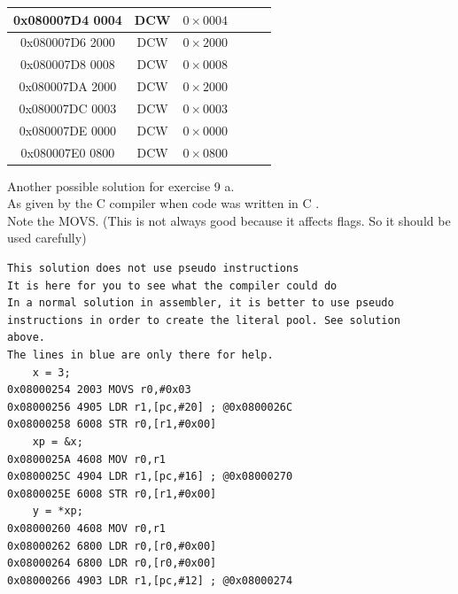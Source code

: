 \documentclass[10pt]{article}
\begin{document}
\begin{center}
\begin{tabular}{|c|c|c|c|c|c|}
\hline
0x080007D4 0004 & DCW & $0 \times 0004$ &  &  &  \\
\hline
0x080007D6 2000 & DCW & $0 \times 2000$ &  &  &  \\
\hline
0x080007D8 0008 & DCW & $0 \times 0008$ &  &  &  \\
\hline
0x080007DA 2000 & DCW & $0 \times 2000$ &  &  &  \\
\hline
0x080007DC 0003 & DCW & $0 \times 0003$ &  &  &  \\
\hline
0x080007DE 0000 & DCW & $0 \times 0000$ &  &  &  \\
\hline
0x080007E0 0800 & DCW & $0 \times 0800$ &  &  &  \\
\hline
\end{tabular}
\end{center}

Another possible solution for exercise 9 a.\\
As given by the C compiler when code was written in C .\\
Note the MOVS. (This is not always good because it affects flags. So it should be used carefully)

\begin{verbatim}
This solution does not use pseudo instructions
It is here for you to see what the compiler could do
In a normal solution in assembler, it is better to use pseudo
instructions in order to create the literal pool. See solution
above.
The lines in blue are only there for help.
    x = 3;
0x08000254 2003 MOVS r0,#0x03
0x08000256 4905 LDR r1,[pc,#20] ; @0x0800026C
0x08000258 6008 STR r0,[r1,#0x00]
    xp = &x;
0x0800025A 4608 MOV r0,r1
0x0800025C 4904 LDR r1,[pc,#16] ; @0x08000270
0x0800025E 6008 STR r0,[r1,#0x00]
    y = *xp;
0x08000260 4608 MOV r0,r1
0x08000262 6800 LDR r0,[r0,#0x00]
0x08000264 6800 LDR r0,[r0,#0x00]
0x08000266 4903 LDR r1,[pc,#12] ; @0x08000274
\end{verbatim}
\end{document}
